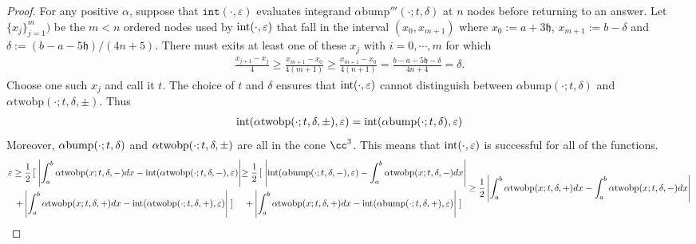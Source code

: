 \documentclass{iitthesis}
\theoremstyle{definition}
\theoremstyle{remark}
\begin{document}
\begin{proof}
  For any positive $\alpha$, suppose that $\texttt{int}(\cdot,\varepsilon)$ evaluates integrand $\alpha\text{bump}'''(\cdot;t,\delta)$ at $n$ nodes before returning to an answer. Let $\{x_j\}_{j=1}^{m})$ be the $m<n$ ordered nodes used by $\textup{int}(\cdot,\varepsilon)$ that fall in the interval $(x_{0},x_{m+1})$ where $x_{0}:=a+3\mathfrak{h}$, $x_{m+1}:=b-\delta$ and $\delta:=(b-a-5\mathfrak{h})/(4n+5)$. There must exits at least one of these $x_{j}$ with $i=0,\cdots,m$ for which
  \begin{align*}
    \frac{x_{j+1}-x_{j}}{4}\ge\frac{x_{m+1}-x_{0}}{4(m+1)}\ge\frac{x_{m+1}-x_{0}}{4(n+1)}=\frac{b-a-5\mathfrak{h}-\delta}{4n+4}=\delta.
  \end{align*}
  Choose one such $x_{j}$ and call it $t$. The choice of $t$ and $\delta$ ensures that $\textup{int}(\cdot,\varepsilon)$ cannot distinguish between $\alpha\text{bump}(\cdot;t,\delta)$ and $\alpha\text{twobp}(\cdot;t,\delta,\pm)$. Thus
  \begin{align*}
    \textup{int}(\alpha\text{twobp}(\cdot;t,\delta,\pm),\varepsilon)=\textup{int}(\alpha\text{bump}(\cdot;t,\delta),\varepsilon)
  \end{align*}
  Moreover, $\alpha\textup{bump}(\cdot;t,\delta)$ and $\alpha\textup{twobp}(\cdot;t,\delta,\pm)$ are all in the cone $\cc^3$. This means that $\textup{int}(\cdot,\varepsilon)$ is successful for all of the functions.
  \begin{subequations}
  \begin{multline*}
    \varepsilon\ge\frac{1}{2}\left[\right.\left|\int_{a}^{b}\alpha\textup{twobp}(x;t,\delta,-)dx-\textup{int}(\alpha\textup{twobp}(\cdot;t,\delta,-),\varepsilon)\right|\\
    +\left|\int_{a}^{b}\alpha\textup{twobp}(x;t,\delta,+)dx-\textup{int}(\alpha\textup{twobp}(\cdot;t,\delta,+),\varepsilon)\right|\left.\right]
  \end{multline*}
  \begin{multline*}
    \ge\frac{1}{2}\left[\right.\left|\textup{int}(\alpha\textup{bump}(\cdot;t,\delta,-),\varepsilon)-\int_{a}^{b}\alpha\textup{twobp}(x;t,\delta,-)dx\right|\\
    +\left|\int_{a}^{b}\alpha\textup{twobp}(x;t,\delta,+)dx-\textup{int}(\alpha\textup{bump}(\cdot;t,\delta,+),\varepsilon)\right|\left.\right]
  \end{multline*}
  \begin{align*}
     &\ge\frac{1}{2}\left|\int_{a}^{b}\alpha\textup{twobp}(x;t,\delta,+)dx-\int_{a}^{b}\alpha\textup{twobp}(x;t,\delta,-)dx\right|\\

\end{align*}
\end{subequations}
\end{proof}
\end{document}
